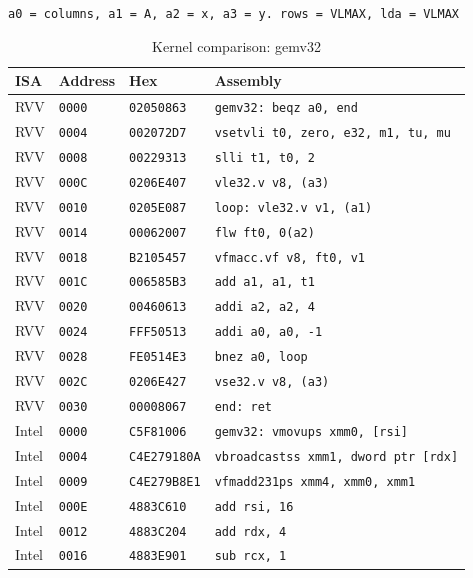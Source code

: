 \begin{table}[htbp]
\centering
\caption{Kernel comparison: gemv32}
\begingroup
\scriptsize
\setlength{\tabcolsep}{4pt}
\noindent \texttt{a0 = columns, a1 = A, a2 = x, a3 = y. rows = VLMAX, lda = VLMAX}\par
\vspace{0.6ex}
\begin{tabular}{@{}l|l|l|p{7.2cm}@{}}
\toprule
ISA & Address & Hex & Assembly \\
\midrule
RVV & \texttt{0000} & \texttt{02050863} & \texttt{gemv32: beqz a0, end} \\
RVV & \texttt{0004} & \texttt{002072D7} & \texttt{vsetvli t0, zero, e32, m1, tu, mu} \\
RVV & \texttt{0008} & \texttt{00229313} & \texttt{slli t1, t0, 2} \\
RVV & \texttt{000C} & \texttt{0206E407} & \texttt{vle32.v v8, (a3)} \\
RVV & \texttt{0010} & \texttt{0205E087} & \texttt{loop: vle32.v v1, (a1)} \\
RVV & \texttt{0014} & \texttt{00062007} & \texttt{flw ft0, 0(a2)} \\
RVV & \texttt{0018} & \texttt{B2105457} & \texttt{vfmacc.vf v8, ft0, v1} \\
RVV & \texttt{001C} & \texttt{006585B3} & \texttt{add a1, a1, t1} \\
RVV & \texttt{0020} & \texttt{00460613} & \texttt{addi a2, a2, 4} \\
RVV & \texttt{0024} & \texttt{FFF50513} & \texttt{addi a0, a0, -1} \\
RVV & \texttt{0028} & \texttt{FE0514E3} & \texttt{bnez a0, loop} \\
RVV & \texttt{002C} & \texttt{0206E427} & \texttt{vse32.v v8, (a3)} \\
RVV & \texttt{0030} & \texttt{00008067} & \texttt{end: ret} \\
\midrule
Intel & \texttt{0000} & \texttt{C5F81006} & \texttt{gemv32: vmovups xmm0, [rsi]} \\
Intel & \texttt{0004} & \texttt{C4E279180A} & \texttt{vbroadcastss xmm1, dword ptr [rdx]} \\
Intel & \texttt{0009} & \texttt{C4E279B8E1} & \texttt{vfmadd231ps xmm4, xmm0, xmm1} \\
Intel & \texttt{000E} & \texttt{4883C610} & \texttt{add rsi, 16} \\
Intel & \texttt{0012} & \texttt{4883C204} & \texttt{add rdx, 4} \\
Intel & \texttt{0016} & \texttt{4883E901} & \texttt{sub rcx, 1} \\

\end{tabular}
\end{table}
